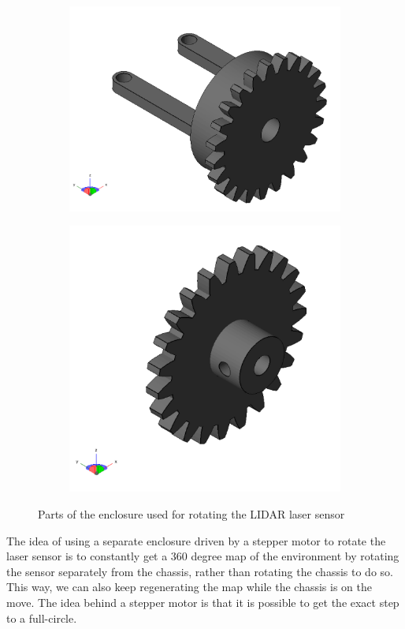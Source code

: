 \begin{figure}[H]
\begin{subfigure}[H]{0.4\textwidth}
	\end{subfigure}
	\newline
	\begin{subfigure}[H]{0.4\textwidth}
		\includegraphics[width=\textwidth]{images/lidarcase-bracket.png}
	\end{subfigure}
	\quad
	\begin{subfigure}[H]{0.4\textwidth}
		\includegraphics[width=\textwidth]{images/lidarcase-steppergear.png}
	\end{subfigure}
	\caption{Parts of the enclosure used for rotating the LIDAR laser sensor}
\end{figure}

The idea of using a separate enclosure driven by a stepper motor to rotate the laser sensor is to constantly get a 360 degree map of the environment by rotating the sensor separately from the chassis, rather than rotating the chassis to do so. This way, we can also keep regenerating the map while the chassis is on the move.  The idea behind a stepper motor is that it is possible to get the exact step to a full-circle.

